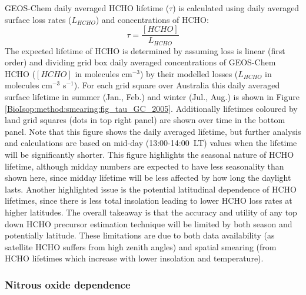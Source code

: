       
      GEOS-Chem daily averaged HCHO lifetime ($\tau$) is calculated using daily averaged surface loss rates ($L_{HCHO}$) and concentrations of HCHO:
      \begin{equation*}
      \tau = \frac{[HCHO]}{L_{HCHO}}
      \end{equation*}
      The expected lifetime of HCHO is determined by assuming loss is linear (first order) and dividing grid box daily averaged concentrations of GEOS-Chem HCHO ($[HCHO]$ in molecules cm$^{-3}$) by their modelled losses ($L_{HCHO}$ in molecules cm$^{-3}$ s$^{-1}$).
      For each grid square over Australia this daily averaged surface lifetime in summer (Jan., Feb.) and winter (Jul., Aug.) is shown in Figure \ref{BioIsop:method:smearing:fig_tau_GC_2005}.
      Additionally lifetimes coloured by land grid squares (dots in top right panel) are shown over time in the bottom panel.
      Note that this figure shows the daily averaged lifetime, but further analysis and calculations are based on mid-day (13:00-14:00~LT) values when the lifetime will be significantly shorter. 
      This figure highlights the seasonal nature of HCHO lifetime, although midday numbers are expected to have less seasonality than shown here, since midday lifetime will be less affected by how long the daylight lasts.
      Another highlighted issue is the potential latitudinal dependence of HCHO lifetimes, since there is less total insolation leading to lower HCHO loss rates at higher latitudes.
      The overall takeaway is that the accuracy and utility of any top down HCHO precursor estimation technique will be limited by both season and potentially latitude.
      These limitations are due to both data availability (as satellite HCHO suffers from high zenith angles) and spatial smearing (from HCHO lifetimes which increase with lower insolation and temperature).
      
      
    
    \subsubsection{Nitrous oxide dependence}
      
